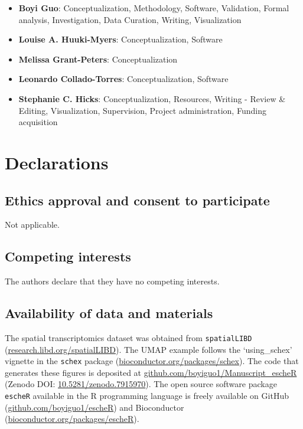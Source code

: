 \documentclass[10pt,twocolumn]{article}
\begin{document}
\begin{itemize}[nosep]
    \item \textbf{Boyi Guo}:  Conceptualization, Methodology, Software, Validation, Formal analysis, Investigation, Data Curation, Writing, Visualization
    \item \textbf{Louise A. Huuki-Myers}: Conceptualization, Software
    \item \textbf{Melissa Grant-Peters}: Conceptualization
    \item \textbf{Leonardo Collado-Torres}: Conceptualization, Software
    \item \textbf{Stephanie C. Hicks}: Conceptualization, Resources, Writing - Review \& Editing, Visualization, Supervision, Project administration, Funding acquisition
\end{itemize}

\section*{Declarations}

\subsection*{Ethics approval and consent to participate}
Not applicable.

\subsection*{Competing interests}
The authors declare that they have no competing interests.

\subsection*{Availability of data and materials}
The spatial transcriptomics dataset was obtained from \texttt{spatialLIBD} (\href{http://research.libd.org/spatialLIBD}{research.libd.org/spatialLIBD}). The UMAP example follows the `using\_schex' vignette in the \texttt{schex} package (\href{https://www.bioconductor.org/packages/schex}{bioconductor.org/packages/schex}). The code that generates these figures is deposited at \href{https://github.com/boyiguo1/Manuscript_escheR}{github.com/boyiguo1/Manuscript\_escheR} (Zenodo DOI: \href{https://zenodo.org/record/7915970}{10.5281/zenodo.7915970}). The open source software package \texttt{escheR} available in the R programming language is freely available on GitHub (\href{https://github.com/boyiguo1/escheR}{github.com/boyiguo1/escheR}) and Bioconductor (\href{https://bioconductor.org/packages/escheR}{bioconductor.org/packages/escheR}).
\end{document}
